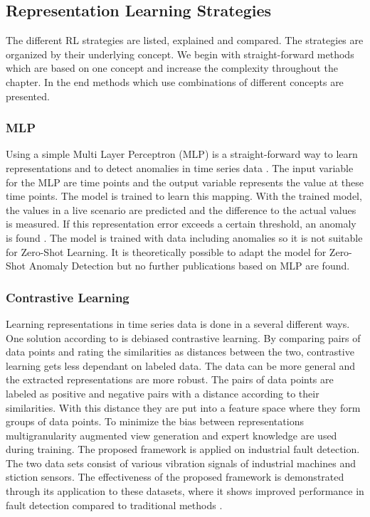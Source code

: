 \subsection{Representation Learning Strategies}
The different RL strategies are listed, explained and compared. The strategies are organized by their underlying concept. We begin with straight-forward methods which are based on one concept and increase the complexity throughout the chapter. In the end methods which use combinations of different concepts are presented.
\subsubsection{MLP}
Using a simple Multi Layer Perceptron (MLP) is a straight-forward way to learn representations and to detect anomalies in time series data \cite{nielsen_neural_2015}. The input variable for the MLP are time points and the output variable represents the value at these time points. The model is trained to learn this mapping. With the trained model, the values in a live scenario are predicted and the difference to the actual values is measured. If this representation error exceeds a certain threshold, an anomaly is found \cite{jeong_time-series_2022}.
The model is trained with data including anomalies so it is not suitable for Zero-Shot Learning. It is theoretically possible to adapt the model for Zero-Shot Anomaly Detection but no further publications based on MLP are found.
\subsubsection{Contrastive Learning}
Learning representations in time series data is done in a several different ways. One solution according to  is debiased contrastive learning. By comparing pairs of data points and rating the similarities as distances between the two, contrastive learning gets less dependant on labeled data. The data can be more general and the extracted representations are more robust. The pairs of data points are labeled as positive and negative pairs with a distance according to their similarities. With this distance they are put into a feature space where they form groups of data points. To minimize the bias between representations multigranularity augmented view generation and expert knowledge are used during training. The proposed framework is applied on industrial fault detection. The two data sets consist of various vibration signals of industrial machines and stiction sensors. The effectiveness of the proposed framework is demonstrated through its application to these datasets, where it shows improved performance in fault detection compared to traditional methods \cite{zhang_debiased_2024}.

